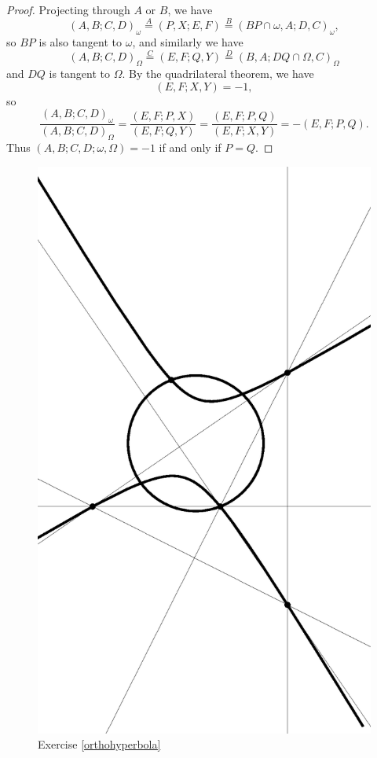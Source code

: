 \begin{proof}
Projecting through $A$ or $B$, we have
\[
(A,B;C,D)_\omega \stackrel{A}{=} (P,X;E,F) \stackrel{B}{=} (BP\cap\omega,A;D,C)_\omega,
\]
so $BP$ is also tangent to $\omega$, and similarly we have
\[
(A,B;C,D)_\Omega \stackrel{C}{=} (E,F;Q,Y) \stackrel{D}{=} (B,A;DQ\cap\Omega,C)_\Omega
\]
and $DQ$ is tangent to $\Omega$. By the quadrilateral theorem, we have
\[
(E,F;X,Y) = -1,
\]
so
\[
\frac{(A,B;C,D)_\omega}{(A,B;C,D)_\Omega} = \frac{(E,F;P,X)}{(E,F;Q,Y)} = \frac{(E,F;P,Q)}{(E,F;X,Y)} = -(E,F;P,Q).
\]
Thus $(A,B;C,D;\omega,\Omega) = -1$ if and only if $P = Q$.
\end{proof}

\begin{figure}[!htb]
\centering
\includegraphics[scale=0.5,angle=270]{righthyperbola.eps}
\caption{Exercise \ref{orthohyperbola}}\label{righthyperbola}
\end{figure}


